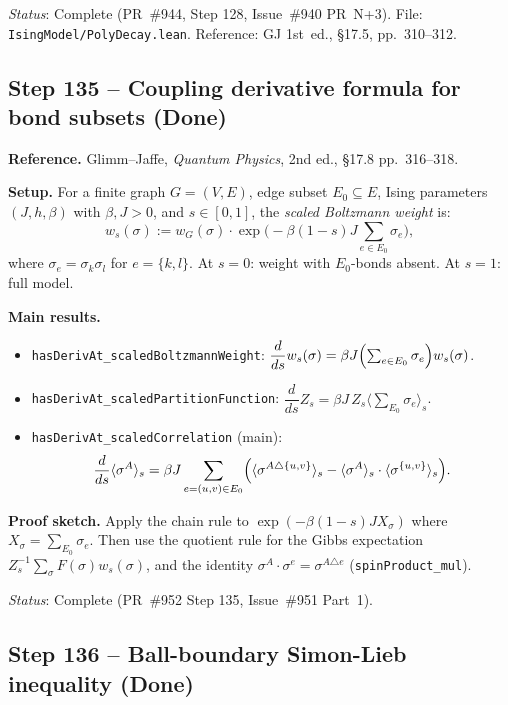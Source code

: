 \documentclass[a4paper,11pt]{article}
\begin{document}
\noindent\textit{Status}: Complete (PR~\#944, Step 128, Issue~\#940 PR~N+3).
File: \texttt{IsingModel/PolyDecay.lean}.
Reference: GJ 1st~ed., \S17.5, pp.~310--312.

\subsection*{Step 135 -- Coupling derivative formula for bond subsets (Done)}

\noindent\textbf{Reference.} Glimm--Jaffe, \emph{Quantum Physics}, 2nd ed., \S17.8 pp.~316--318.

\noindent\textbf{Setup.}
For a finite graph $G=(V,E)$, edge subset $E_0\subseteq E$, Ising parameters $(J,h,\beta)$ with $\beta,J>0$,
and $s\in[0,1]$, the \emph{scaled Boltzmann weight} is:
\[w_s(\sigma) := w_G(\sigma)\cdot\exp\!\bigl(-\beta(1-s)J\sum_{e\in E_0}\sigma_e\bigr),\]
where $\sigma_e = \sigma_k\sigma_l$ for $e=\{k,l\}$.
At $s=0$: weight with $E_0$-bonds absent. At $s=1$: full model.

\noindent\textbf{Main results.}
\begin{itemize}
  \item \texttt{hasDerivAt\_scaledBoltzmannWeight}:
    $\dfrac{d}{ds}w_s(\sigma) = \beta J\Bigl(\sum_{e\in E_0}\sigma_e\Bigr)w_s(\sigma)$.
  \item \texttt{hasDerivAt\_scaledPartitionFunction}:
    $\dfrac{d}{ds}Z_s = \beta J\,Z_s\bigl\langle\sum_{E_0}\sigma_e\bigr\rangle_s$.
  \item \texttt{hasDerivAt\_scaledCorrelation} (main):
    \[\frac{d}{ds}\langle\sigma^A\rangle_s = \beta J\sum_{e=(u,v)\in E_0}
      \Bigl(\langle\sigma^{A\triangle\{u,v\}}\rangle_s - \langle\sigma^A\rangle_s\cdot\langle\sigma^{\{u,v\}}\rangle_s\Bigr).\]
\end{itemize}

\noindent\textbf{Proof sketch.}
Apply the chain rule to $\exp(-\beta(1-s)J X_\sigma)$ where $X_\sigma=\sum_{E_0}\sigma_e$.
Then use the quotient rule for the Gibbs expectation $Z_s^{-1}\sum_\sigma F(\sigma)w_s(\sigma)$,
and the identity $\sigma^A\cdot\sigma^e=\sigma^{A\triangle e}$ (\texttt{spinProduct\_mul}).

\noindent\textit{Status}: Complete (PR~\#952 Step 135, Issue~\#951 Part~1).

\subsection*{Step 136 -- Ball-boundary Simon-Lieb inequality (Done)}
\end{document}
